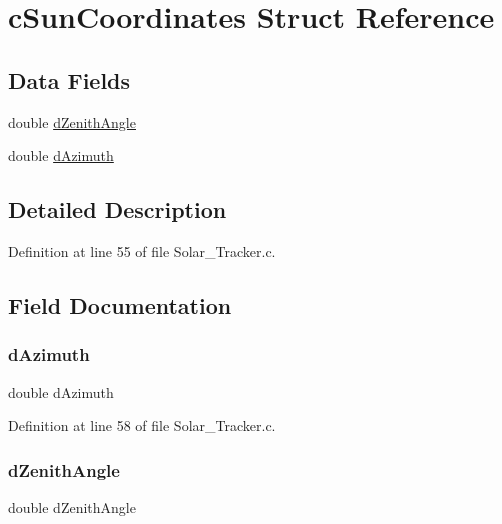 \hypertarget{structc_sun_coordinates}{}\section{c\+Sun\+Coordinates Struct Reference}
\label{structc_sun_coordinates}
\subsection*{Data Fields}
\begin{DoxyCompactItemize}
\item 
double \hyperlink{structc_sun_coordinates_a5ac26b8d2a7bcbd71498ed6ef7699562}{d\+Zenith\+Angle}
\item 
double \hyperlink{structc_sun_coordinates_a13d7acb0e942e2d9812b25cc7fa34f43}{d\+Azimuth}
\end{DoxyCompactItemize}


\subsection{Detailed Description}


Definition at line 55 of file Solar\+\_\+\+Tracker.\+c.



\subsection{Field Documentation}
\mbox{\label{structc_sun_coordinates_a13d7acb0e942e2d9812b25cc7fa34f43}} 
\subsubsection{\texorpdfstring{d\+Azimuth}{dAzimuth}}
{\footnotesize\ttfamily double d\+Azimuth}



Definition at line 58 of file Solar\+\_\+\+Tracker.\+c.

\mbox{\label{structc_sun_coordinates_a5ac26b8d2a7bcbd71498ed6ef7699562}} 
\subsubsection{\texorpdfstring{d\+Zenith\+Angle}{dZenithAngle}}
{\footnotesize\ttfamily double d\+Zenith\+Angle}



